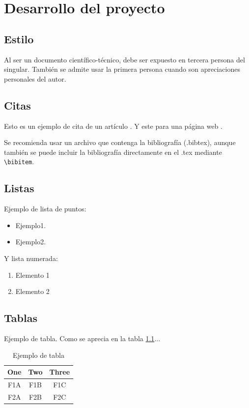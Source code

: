 \chapter{Desarrollo del proyecto}

\section{Estilo}

Al ser un documento científico-técnico, debe ser expuesto en tercera persona del singular. También se admite usar la primera persona cuando son apreciaciones personales del autor.

\section{Citas}


Esto es un ejemplo de cita de un artículo \cite{Brunete:2013}. Y este para una página web \cite{google2018}.

Se recomienda usar un archivo que contenga la bibliografía (.bibtex), aunque también se puede incluir la bibliografía directamente en el .tex mediante \verb=\bibitem=.


\section{Listas}

Ejemplo de lista de puntos:
\begin{itemize}
\item Ejemplo1.
\item Ejemplo2.
\end{itemize} 

Y lista numerada:
\begin{enumerate}
\item Elemento 1
\item Elemento 2
\end{enumerate}

\section{Tablas}

Ejemplo de tabla. Como se aprecia en la tabla \ref{tab:table_example}...
\begin{table}[tb]
\caption{Ejemplo de tabla}
\label{tab:table_example}
\begin{center}
\begin{tabular}{|c||c|c|}
\hline
One & Two & Three\\
\hline
\hline
F1A & F1B & F1C\\
F2A & F2B & F2C\\
\hline
\end{tabular}
\end{center}
\end{table}


